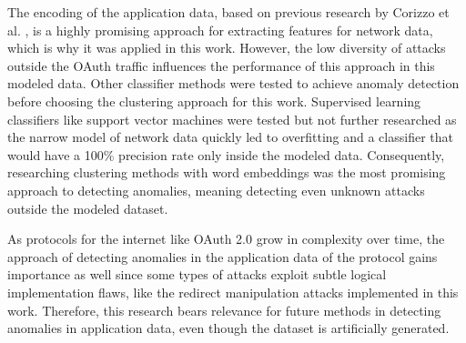 The encoding of the application data, based on previous research by Corizzo et al. \cite{corizzo2020feature}, is a highly promising approach for extracting features for network data, which is why it was applied in this work. However, the low diversity of attacks outside the OAuth traffic influences the performance of this approach in this modeled data. Other classifier methods were tested to achieve anomaly detection before choosing the clustering approach for this work. Supervised learning classifiers like support vector machines were tested but not further researched as the narrow model of network data quickly led to overfitting and a classifier that would have a 100\% precision rate only inside the modeled data. Consequently, researching clustering methods with word embeddings was the most promising approach to detecting anomalies, meaning detecting even unknown attacks outside the modeled dataset.

As protocols for the internet like OAuth 2.0 grow in complexity over time, the approach of detecting anomalies in the application data of the protocol gains importance as well since some types of attacks exploit subtle logical implementation flaws, like the redirect manipulation attacks implemented in this work. Therefore, this research bears relevance for future methods in detecting anomalies in application data, even though the dataset is artificially generated.